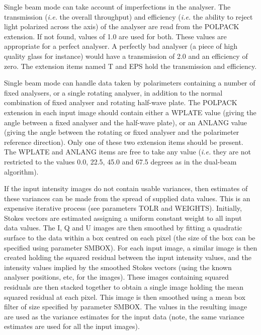 \documentclass[twoside,11pt]{article}
\renewcommand{\_}{\texttt{\symbol{95}}}
\begin{document}
{{      Single beam mode can take account of imperfections in the analyser.
      The transmission (\emph{i.e.} the overall throughput) and efficiency
      (\emph{i.e.} the ability to reject light polarized across the axis) of the
      analyser are read from the POLPACK extension. If not found, values
      of 1.0 are used for both. These values are appropriate for a
      perfect analyser. A perfectly bad analyser (a piece of high quality
      glass for instance) would have a transmission of 2.0 and an
      efficiency of zero. The extension items named T and EPS hold the
      transmission and efficiency.

      Single beam mode can handle data taken by polarimeters containing
      a number of fixed analysers, or a single rotating analyser, in
      addition to the normal combination of fixed analyser and rotating
      half-wave plate. The POLPACK extension in each input image should
      contain either a WPLATE value (giving the angle between a fixed
      analyser and the half-wave plate), or an ANLANG value (giving the
      angle between the rotating or fixed analyser and the polarimeter
      reference direction). Only one of these two extension items
      should be present. The WPLATE and ANLANG items are free to take
      any value (\emph{i.e.} they are not restricted to the values 0.0, 22.5,
      45.0 and 67.5 degrees as in the dual-beam algorithm).

      If the input intensity images do not contain usable variances,
      then estimates of these variances can be made from the spread of
      supplied data values. This is an expensive iterative process
      (see parameters TOLR and WEIGHTS). Initially, Stokes vectors
      are estimated assigning a uniform constant weight to all input
      data values. The I, Q and U images are then smoothed by fitting
      a quadratic surface to the data within a box centred on each
      pixel (the size of the box can be specified using parameter
      SMBOX). For each input image, a similar image is then created
      holding the squared residual between the input intensity values,
      and the intensity values implied by the smoothed Stokes vectors
      (using the known analyser positions, etc, for the images). These
      images containing squared residuals are then stacked together
      to obtain a single image holding the mean squared residual at
      each pixel. This image is then smoothed using a mean box filter
      of size specified by parameter SMBOX. The values in the resulting
      image are used as the variance estimates for the input data (note,
      the same variance estimates are used for all the input images).

}}
\end{document}
